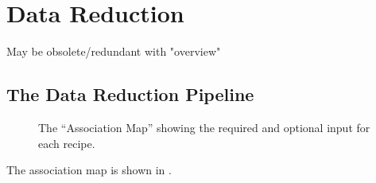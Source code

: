 \section{Data Reduction}
\label{sec:datareduction}


May be obsolete/redundant with "overview"

\subsection{The Data Reduction Pipeline}
\label{sec:datareduction-pipeline}

\begin{figure}[!tb]
  \begin{center}
  \end{center}
  \caption{
    \label{fig:association-map}
    The \instrument{} ``Association Map'' showing the required and optional
    input for each recipe.}
\end{figure}

The \instrument{} association map is shown in .
